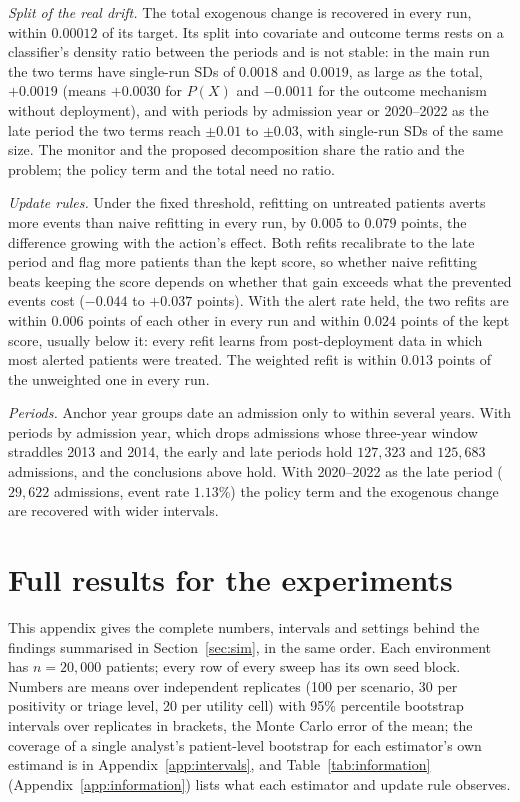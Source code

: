 \documentclass[letterpaper]{article} %
\begin{document}
\emph{Split of the real drift.} The total exogenous change is recovered in
every run, within $0.00012$ of its target. Its split into covariate and
outcome terms rests on a classifier's density ratio between the periods and is
not stable: in the main run the two terms have single-run SDs of $0.0018$ and
$0.0019$, as large as the total, $+0.0019$ (means $+0.0030$ for $P(X)$ and $-0.0011$ for
the outcome mechanism without deployment), and with periods by admission year
or 2020--2022 as the late period the two terms reach $\pm 0.01$ to
$\pm 0.03$, with single-run SDs of the same size. The monitor and the proposed
decomposition share the ratio and the problem; the policy term and the total
need no ratio.

\emph{Update rules.} Under the fixed threshold, refitting on untreated
patients averts more events than naive refitting in every run, by $0.005$ to
$0.079$ points, the difference growing with the action's effect. Both refits
recalibrate to the late period and flag more patients than the kept score, so
whether naive refitting beats keeping the score depends on whether that gain
exceeds what the prevented events cost ($-0.044$ to $+0.037$ points). With
the alert rate held, the two refits are within $0.006$ points of each other in
every run and within $0.024$ points of the kept score, usually below it: every
refit learns from post-deployment data in which most alerted patients were
treated. The weighted refit is within $0.013$ points of the unweighted one in
every run.

\emph{Periods.} Anchor year groups date an admission only to within several
years. With periods by admission year, which drops admissions whose
three-year window straddles 2013 and 2014, the early and late periods hold
$127{,}323$ and $125{,}683$ admissions, and the conclusions above hold. With
2020--2022 as the late period ($29{,}622$ admissions, event rate $1.13\%$) the
policy term and the exogenous change are recovered with wider intervals.


\section{Full results for the experiments}
\label{app:details}
This appendix gives the complete numbers, intervals and settings behind
the findings summarised in Section~\ref{sec:sim}, in the same order.
Each environment has $n = 20{,}000$ patients; every
row of every sweep has its own seed block. Numbers are means over independent
replicates (100 per scenario, 30 per positivity or triage level, 20 per
utility cell) with 95\% percentile bootstrap intervals over replicates in
brackets, the Monte Carlo error of the mean; the coverage of a single
analyst's patient-level bootstrap for each estimator's own estimand is in
Appendix~\ref{app:intervals}, and Table~\ref{tab:information} (Appendix~\ref{app:information}) lists what
each estimator and update rule observes.
\end{document}
